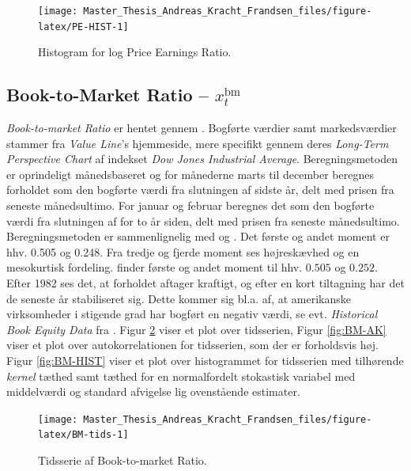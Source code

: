 \documentclass[
  a4paper,
  oneside]{memoir}
\begin{document}
\begin{figure}[H]

{\centering \texttt{[image: Master\_Thesis\_Andreas\_Kracht\_Frandsen\_files/figure-latex/PE-HIST-1]} 

}

\caption{Histogram for log Price Earnings Ratio.}\label{fig:PE-HIST}
\end{figure}

\hypertarget{book-to-market-ratio-x_ttextbm}{%
\subsection{\texorpdfstring{Book-to-Market Ratio -- \(x_t^{\text{bm}}\)}{Book-to-Market Ratio -- x\_t\^{}\{\textbackslash text\{bm\}\}}}\label{book-to-market-ratio-x_ttextbm}}

\emph{Book-to-market Ratio} er hentet gennem \citep{Goyal2007}. Bogførte værdier samt markedsværdier stammer fra \emph{Value Line}'s hjemmeside, mere specifikt gennem deres \emph{Long-Term Perspective Chart} af indekset \emph{Dow Jones Industrial Average}. Beregningsmetoden er oprindeligt månedsbaseret og for månederne marts til december beregnes forholdet som den bogførte værdi fra slutningen af sidste år, delt med prisen fra seneste månedsultimo. For januar og februar beregnes det som den bogførte værdi fra slutningen af for to år siden, delt med prisen fra seneste månedsultimo. Beregningsmetoden er sammenlignelig med \citep{Kothari1997} og \citep{Pontiff1998}. Det første og andet moment er hhv. 0.505 og 0.248. Fra tredje og fjerde moment ses højreskævhed og en mesokurtisk fordeling. \citep{Pontiff1998} finder første og andet moment til hhv. \(0.505\) og \(0.252\). Efter 1982 ses det, at forholdet aftager kraftigt, og efter en kort tiltagning har det de seneste år stabiliseret sig. Dette kommer sig bl.a. af, at amerikanske virksomheder i stigende grad har bogført en negativ værdi, se evt. \emph{Historical Book Equity Data} fra \citep{French2020}. Figur \ref{fig:BM-tids} viser et plot over tidsserien, Figur \ref{fig:BM-AK} viser et plot over autokorrelationen for tidsserien, som der er forholdsvis høj. Figur \ref{fig:BM-HIST} viser et plot over histogrammet for tidsserien med tilhørende \emph{kernel} tæthed samt tæthed for en normalfordelt stokastisk variabel med middelværdi og standard afvigelse lig ovenstående estimater.

\begin{figure}[H]

{\centering \texttt{[image: Master\_Thesis\_Andreas\_Kracht\_Frandsen\_files/figure-latex/BM-tids-1]} 

}

\caption{Tidsserie af Book-to-market Ratio.}\label{fig:BM-tids}
\end{figure}
\end{document}
